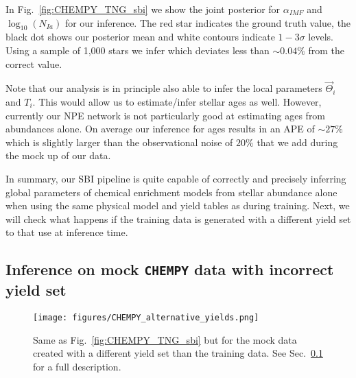 \documentclass{aa}
\begin{document}
In Fig.~\ref{fig:CHEMPY_TNG_sbi} we show the joint posterior for $\alpha_{IMF}$ and $\log_{10}(N_{Ia})$ for our inference. The red star indicates the ground truth value, the black dot shows our posterior mean and white contours indicate $1-3\sigma$ levels.
%
Using a sample of 1,000 stars we infer  which deviates less than $\sim0.04\%$ from the correct value.

Note that our analysis is in principle also able to infer the local parameters $\Vec{\Theta}_i$ and $T_i$. This would allow us to estimate/infer stellar ages as well. However, currently our NPE network is not particularly good at estimating ages from abundances alone. On average our inference for ages results in an APE of $\sim27\%$ which is slightly larger than the observational noise of $20\%$ that we add during the mock up of our data.

In summary, our SBI pipeline is quite capable of correctly and precisely inferring  global parameters of chemical enrichment models from stellar abundance alone when using the same physical model and yield tables as during training. Next, we will check what happens if the training data is generated with a different yield set to that use at inference time.


\subsection{Inference on mock \texttt{CHEMPY} data with incorrect yield set}
\label{subsec:mocks_wrong_yield}

\begin{figure}
    \centering
    \texttt{[image: figures/CHEMPY\_alternative\_yields.png]}
    \vspace{-.25cm}
    \caption{Same as Fig.~\ref{fig:CHEMPY_TNG_sbi} but for the mock data created with a different yield set than the training data. See Sec.~\ref{subsec:mocks_wrong_yield} for a full description.}
    \label{fig:CHEMPY_alt_sbi} 
\end{figure}
\end{document}
